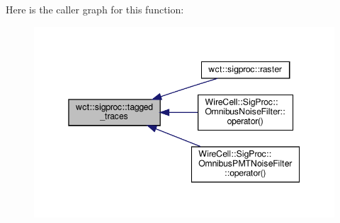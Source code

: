 Here is the caller graph for this function\+:
\nopagebreak
\begin{figure}[H]
\begin{center}
\leavevmode
\includegraphics[width=345pt]{namespacewct_1_1sigproc_a7be8644ccb0052eb5c68551b924b9b6f_icgraph}
\end{center}
\end{figure}
